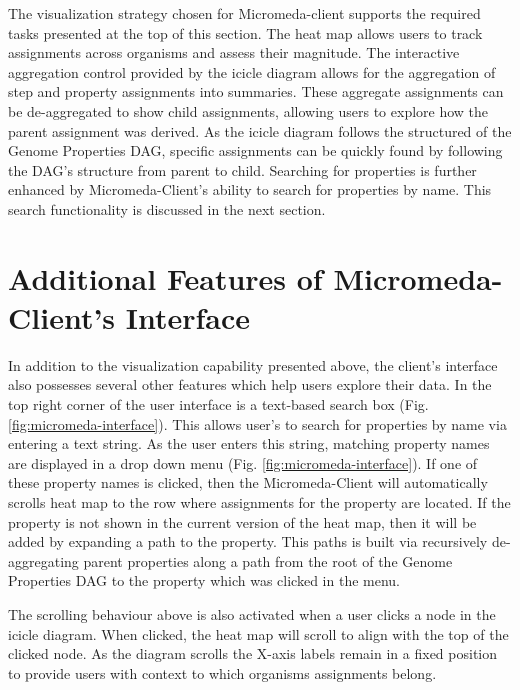 The visualization strategy chosen for Micromeda-client supports the required tasks presented at the top of this section. The heat map allows users to track assignments across organisms and assess their magnitude. The interactive aggregation control provided by the icicle diagram allows for the aggregation of step and property assignments into summaries. These aggregate assignments can be de-aggregated to show child assignments, allowing users to explore how the parent assignment was derived. As the icicle diagram follows the structured of the Genome Properties DAG, specific assignments can be quickly found by following the DAG's structure from parent to child. Searching for properties is further enhanced by Micromeda-Client's ability to search for properties by name. This search functionality is discussed in the next section.

\section{Additional Features of Micromeda-Client's Interface} \label{client-additional-features}

In addition to the visualization capability presented above, the client's interface also possesses several other features which help users explore their data. In the top right corner of the user interface is a text-based search box (Fig. \ref{fig:micromeda-interface}). This allows user's to search for properties by name via entering a text string. As the user enters this string, matching property names are displayed in a drop down menu (Fig. \ref{fig:micromeda-interface}). If one of these property names is clicked, then the Micromeda-Client will automatically scrolls heat map to the row where assignments for the property are located. If the property is not shown in the current version of the heat map, then it will be added by expanding a path to the property. This paths is built via recursively de-aggregating parent properties along a path from the root of the Genome Properties DAG to the property which was clicked in the menu.

The scrolling behaviour above is also activated when a user clicks a node in the icicle diagram. When clicked, the heat map will scroll to align with the top of the clicked node. As the diagram scrolls the X-axis labels remain in a fixed position to provide users with context to which organisms assignments belong. 

